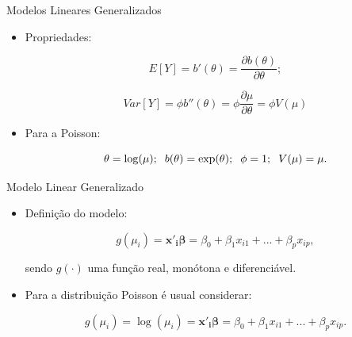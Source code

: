 \documentclass[10pt, aspectratio=169]{beamer}
\begin{document}


\begin{frame}{Modelos Lineares Generalizados} 
\begin{itemize}

\item Propriedades:

$$
    E[Y]=b'(\theta)=\frac{\partial b(\theta)}{\partial \theta};
$$ 

$$   
    Var[Y]=\phi b''(\theta)=\phi\frac{\partial \mu}{\partial \theta}=\phi V(\mu)
$$


\item Para a Poisson:

$$\theta = \log(\mu); \hspace{0.2cm} b(\theta)=\exp(\theta); \hspace{0.2cm} \phi=1; \hspace{0.2cm} V(\mu)=\mu.$$

\end{itemize}
\end{frame}




\begin{frame}{Modelo Linear Generalizado} 

\begin{itemize}


 \item Definição do modelo:

  \vspace{0,5cm}  
  
$$
   g(\mu_{i})=\boldsymbol{x'_{i}\beta}=\beta_{0}+\beta_{1}x_{i1}+...+\beta_{p}x_{ip},
$$

  \vspace{0,5cm}  
  
sendo $g(\cdot)$ uma função real, monótona e diferenciável.

  \vspace{0,5cm}  
  
\item Para a distribuição Poisson é usual considerar:

$$
   g(\mu_{i})= \log(\mu_i) = \boldsymbol{x'_{i}\beta}=\beta_{0}+\beta_{1}x_{i1}+...+\beta_{p}x_{ip}.
$$

\end{itemize}

\end{frame}
\end{document}
